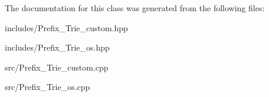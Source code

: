 The documentation for this class was generated from the following files\+:\begin{DoxyCompactItemize}
\item 
includes/Prefix\+\_\+\+Trie\+\_\+custom.\+hpp\item 
includes/Prefix\+\_\+\+Trie\+\_\+os.\+hpp\item 
src/Prefix\+\_\+\+Trie\+\_\+custom.\+cpp\item 
src/Prefix\+\_\+\+Trie\+\_\+os.\+cpp\end{DoxyCompactItemize}
